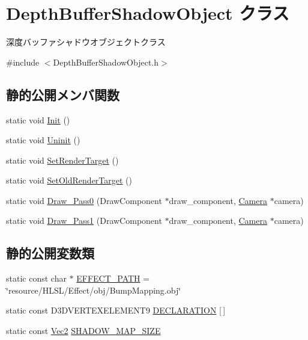\hypertarget{class_depth_buffer_shadow_object}{}\section{Depth\+Buffer\+Shadow\+Object クラス}
\label{class_depth_buffer_shadow_object}


深度バッファシャドウオブジェクトクラス  




{\ttfamily \#include $<$Depth\+Buffer\+Shadow\+Object.\+h$>$}

\subsection*{静的公開メンバ関数}
\begin{DoxyCompactItemize}
\item 
static void \mbox{\hyperlink{class_depth_buffer_shadow_object_a03e23f51e5e68babc7a1a42d0fedfba0}{Init}} ()
\item 
static void \mbox{\hyperlink{class_depth_buffer_shadow_object_a6f5e6542143cffef6b7a9e69f6c9cd94}{Uninit}} ()
\item 
static void \mbox{\hyperlink{class_depth_buffer_shadow_object_ac575084492645de134c6f1990ed7d2dc}{Set\+Render\+Target}} ()
\item 
static void \mbox{\hyperlink{class_depth_buffer_shadow_object_a2ac079b069c8f60b8d681868b9afce89}{Set\+Old\+Render\+Target}} ()
\item 
static void \mbox{\hyperlink{class_depth_buffer_shadow_object_a7916c03b90a01c71a9050e721cf6810c}{Draw\+\_\+\+Pass0}} (Draw\+Component $\ast$draw\+\_\+component, \mbox{\hyperlink{class_camera}{Camera}} $\ast$camera)
\item 
static void \mbox{\hyperlink{class_depth_buffer_shadow_object_a4bf8a72a447aa6ff150f3fef630ab448}{Draw\+\_\+\+Pass1}} (Draw\+Component $\ast$draw\+\_\+component, \mbox{\hyperlink{class_camera}{Camera}} $\ast$camera)
\end{DoxyCompactItemize}
\subsection*{静的公開変数類}
\begin{DoxyCompactItemize}
\item 
static const char $\ast$ \mbox{\hyperlink{class_depth_buffer_shadow_object_aaa0b1c0ca424614c5cf7368f00fa5fa0}{E\+F\+F\+E\+C\+T\+\_\+\+P\+A\+TH}} = \char`\"{}resource/H\+L\+SL/Effect/obj/Bump\+Mapping.\+obj\char`\"{}
\item 
static const D3\+D\+V\+E\+R\+T\+E\+X\+E\+L\+E\+M\+E\+N\+T9 \mbox{\hyperlink{class_depth_buffer_shadow_object_a9238d9843ca8654d67809dfbd5600137}{D\+E\+C\+L\+A\+R\+A\+T\+I\+ON}} \mbox{[}$\,$\mbox{]}
\item 
static const \mbox{\hyperlink{_vector3_d_8h_a5ef6e95dfc5f9d3820b71772d99bbc25}{Vec2}} \mbox{\hyperlink{class_depth_buffer_shadow_object_aa7a8ac55e3de545dacb0cfde57fd1017}{S\+H\+A\+D\+O\+W\+\_\+\+M\+A\+P\+\_\+\+S\+I\+ZE}}
\end{DoxyCompactItemize}
